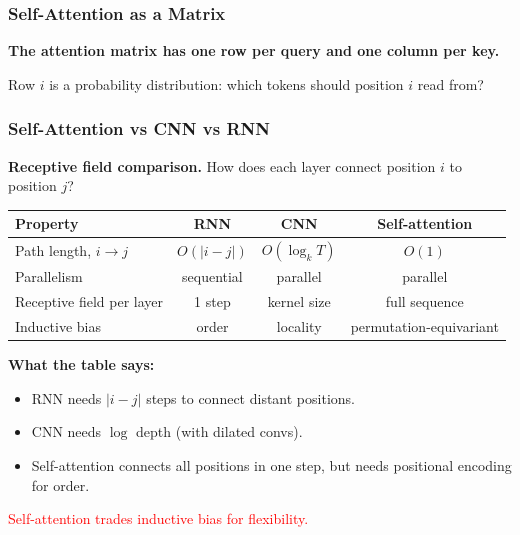 \documentclass[notes,11pt, aspectratio=169]{beamer}
\begin{document}
\begin{frame}
\frametitle{Self-Attention as a Matrix}

\textbf{The attention matrix has one row per query and one column per key.}

\vspace{6pt}
\begin{center}
\end{center}

\vspace{4pt}
Row $i$ is a probability distribution: which tokens should position $i$ read from?
\end{frame}

\begin{frame}
\frametitle{Self-Attention vs CNN vs RNN}

\textbf{Receptive field comparison.} How does each layer connect position $i$ to position $j$?

\vspace{4pt}
\begin{center}
\renewcommand{\arraystretch}{1.18}
\scriptsize
\begin{tabular}{l c c c}
\toprule
\textbf{Property} & \textbf{RNN} & \textbf{CNN} & \textbf{Self-attention} \\
\midrule
Path length, $i \to j$ & $O(|i - j|)$ & $O(\log_k T)$ & $O(1)$ \\
Parallelism & sequential & parallel & parallel \\
Receptive field per layer & 1 step & kernel size & full sequence \\
Inductive bias & order & locality & permutation-equivariant \\
\bottomrule
\end{tabular}
\end{center}

\vspace{5pt}
\textbf{What the table says:}
\begin{itemize}
    \item RNN needs $|i - j|$ steps to connect distant positions.
    \item CNN needs $\log$ depth (with dilated convs).
    \item Self-attention connects all positions in one step, but needs positional encoding for order.
\end{itemize}

\vspace{4pt}
\textcolor{red}{Self-attention trades inductive bias for flexibility.}
\end{frame}
\end{document}
